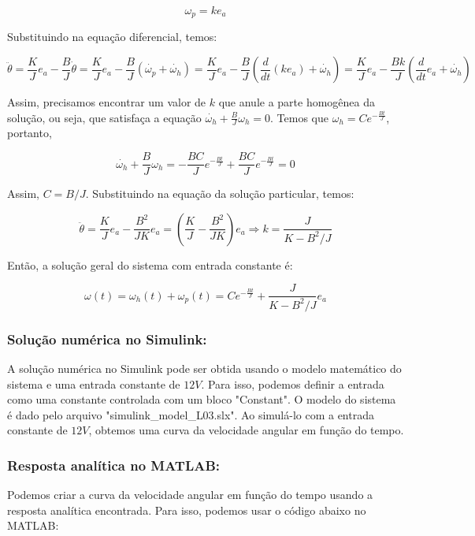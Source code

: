 \documentclass[a4paper, 12pt]{article}
\begin{document}
\begin{equation}
    \omega_p = k e_a
\end{equation}

Substituindo na equação diferencial, temos:

\begin{equation}
    \ddot{\theta} = \frac{K}{J} e_a - \frac{B}{J} \dot{\theta} = \frac{K}{J} e_a - \frac{B}{J}(\dot{\omega_p}+\dot{\omega_h}) = \frac{K}{J} e_a - \frac{B}{J}(\frac{d}{dt}(ke_a)+\dot{\omega_h}) = \frac{K}{J} e_a - \frac{Bk}{J}(\frac{d}{dt}e_a+\dot{\omega_h}) 
\end{equation}

Assim, precisamos encontrar um valor de $k$ que anule a parte homogênea da solução, ou seja, que satisfaça a equação $\dot{\omega_h} + \frac{B}{J}\omega_h = 0$. Temos que $\omega_h = C e^{-\frac{Bt}{J}}$, portanto, 

\begin{equation}
    \dot{\omega_h} + \frac{B}{J}\omega_h = -\frac{BC}{J}e^{-\frac{Bt}{J}} + \frac{BC}{J}e^{-\frac{Bt}{J}} = 0
\end{equation}

Assim, $C=B/J$. Substituindo na equação da solução particular, temos:

\begin{equation}
    \ddot{\theta} = \frac{K}{J} e_a - \frac{B^2}{JK} e_a = (\frac{K}{J} - \frac{B^2}{JK}) e_a \Rightarrow k = \frac{J}{K-B^2/J}
\end{equation}

Então, a solução geral do sistema com entrada constante é: 

\begin{equation}
    \omega(t) = \omega_h(t) + \omega_p(t) = C e^{-\frac{Bt}{J}} + \frac{J}{K-B^2/J} e_a
\end{equation}

\subsubsection{Solução numérica no Simulink:}

A solução numérica no Simulink pode ser obtida usando o modelo matemático do sistema e uma entrada constante de $12V$. Para isso, podemos definir a entrada como uma constante controlada com um bloco "Constant". O modelo do sistema é dado pelo arquivo "simulink_model_L03.slx". Ao simulá-lo com a entrada constante de $12V$, obtemos uma curva da velocidade angular em função do tempo.

\subsubsection{Resposta analítica no MATLAB:}
Podemos criar a curva da velocidade angular em função do tempo usando a resposta analítica encontrada. Para isso, podemos usar o código abaixo no MATLAB:
\end{document}
